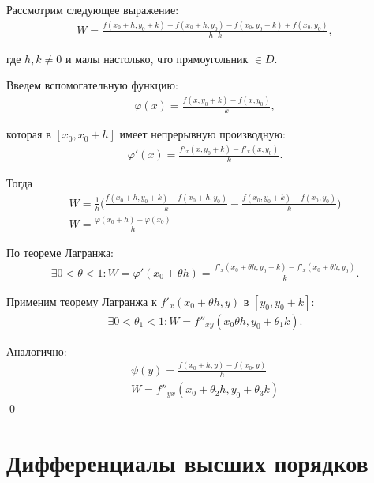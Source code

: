 \documentclass[a4paper,12pt,oneside]{extbook}
\theoremstyle{numbered}
\theoremstyle{unnumbered}
\theoremstyle{named}
\theoremstyle{unnumbered}
\theoremstyle{named}
\theoremstyle{named}
\theoremstyle{named}
\renewenvironment{proof}{{\noindent\textbf{Доказательство.}}}{\qed}
\begin{document}
\begin{proof}
    Рассмотрим следующее выражение:
    \begin{gather*}
        W = \frac{f(x_0 + h, y_0 + k) - f(x_0 + h, y_0) - f(x_0, y_0 + k) + f(x_0, y_0)}{h \cdot k},
    \end{gather*}

    где \(h, k \neq 0\) и малы настолько, что прямоугольник %
    \(\in D\).

    Введем вспомогательную функцию:
    \begin{gather*}
        \varphi(x) = \frac{f(x, y_0 + k) - f(x, y_0)}{k},
    \end{gather*}

    которая в \([x_0, x_0 + h]\) имеет непрерывную производную:
    \begin{gather*}
        \varphi'(x) = \frac{f'_x(x, y_0 + k) - f'_x(x, y_0)}{k}.
    \end{gather*}

    Тогда
    \begin{gather*}
        W = \frac{1}{h} \Big( \frac{f(x_0 + h, y_0 + k) - f(x_0 + h, y_0)}{k} - \frac{f(x_0, y_0 + k) - f(x_0, y_0)}{k} \Big) \\
        W = \frac{\varphi(x_0 + h) - \varphi(x_0)}{h}
    \end{gather*}

    По теореме Лагранжа:
    \begin{gather*}
        \exists 0 < \theta < 1: W = \varphi'(x_0 + \theta h) = \frac{f'_x(x_0 + \theta h, y_0 + k) - f'_x(x_0 + \theta h, y_0)}{k}.
    \end{gather*}

    Применим теорему Лагранжа к \(f'_x(x_0 + \theta h, y)\) в \([y_0, y_0 + k]\):
    \begin{gather*}
        \exists 0 < \theta_1 < 1: W = f''_{xy}(x_0 \theta h, y_0 + \theta_1 k).
    \end{gather*}

    Аналогично:
    \begin{gather*}
        \psi (y) = \frac{f(x_0 + h, y) - f(x_0, y)}{h} \\
        W = f''_{yx}(x_0 + \theta_2 h, y_0 + \theta_3 k)
    \end{gather*}
\end{proof}

\section{Дифференциалы высших порядков}%
\label{sec:Дифференциалы высших порядков}
\end{document}
